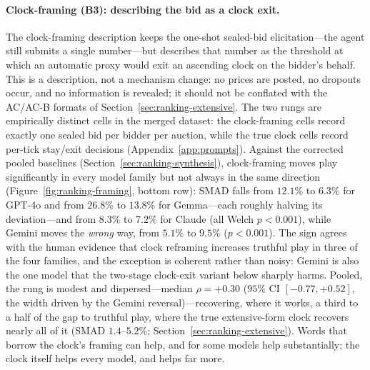\paragraph{Clock-framing (B3): describing the bid as a clock exit.}
The clock-framing description keeps the one-shot sealed-bid elicitation---the
agent still submits a single number---but describes that number as the
threshold at which an automatic proxy would exit an ascending clock on the
bidder's behalf. This is a description, not a mechanism change: no prices are
posted, no dropouts occur, and no information is revealed; it should not be
conflated with the AC/AC-B formats of Section~\ref{sec:ranking-extensive}.
The two rungs are empirically distinct cells in the merged dataset: the
clock-framing cells record exactly one sealed bid per bidder per auction,
while the true clock cells record per-tick stay/exit decisions
(Appendix~\ref{app:prompts}). Against the corrected pooled baselines
(Section~\ref{sec:ranking-synthesis}), clock-framing moves play
significantly in every model family but not always in the same direction
(Figure~\ref{fig:ranking-framing}, bottom row): SMAD falls from $12.1\%$ to
$6.3\%$ for GPT-4o and from $26.8\%$ to $13.8\%$ for Gemma---each
roughly halving its deviation---and from $8.3\%$ to $7.2\%$ for Claude (all
Welch $p < 0.001$), while Gemini moves the \emph{wrong} way, from $5.1\%$ to
$9.5\%$ ($p < 0.001$). The sign agrees with the human evidence that clock
reframing increases truthful play \citep{breitmoser2022obviousness} in three
of the four families, and the exception is coherent rather than noisy:
Gemini is also the one model that the two-stage clock-exit variant below
sharply harms. Pooled, the rung is modest and dispersed---median
$\rho = +0.30$ ($95\%$ CI $[-0.77, +0.52]$, the width driven by the Gemini
reversal)---recovering, where it works, a third to a half of the gap to
truthful play, where the true extensive-form clock recovers nearly all of it
(SMAD $1.4$--$5.2\%$; Section~\ref{sec:ranking-extensive}). Words that
borrow the clock's framing can help, and for some models help substantially;
the clock itself helps every model, and helps far more.

